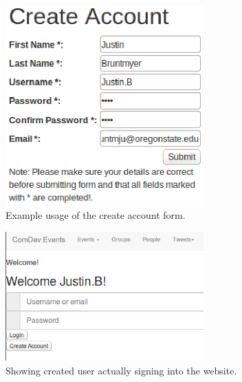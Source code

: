 \documentclass[draftclsnofoot,10pt,onecolumn]{IEEEtran} %
\begin{document}
\begin{figure}[H]
  \begin{center}
  
  \includegraphics[width=3in, frame]{createAccountForm}
  \captionsetup{width=.4\linewidth}
  \centering
  \caption{Example usage of the create account form. }

  \end{center}
\end{figure}

\begin{figure}[H]
  \begin{center}
  
  \includegraphics[width=3in, frame]{loginSuccess}
  \captionsetup{width=.4\linewidth}
  \centering
  \caption{Showing created user actually signing into the website. }

  \end{center}
\end{figure}
\end{document}
